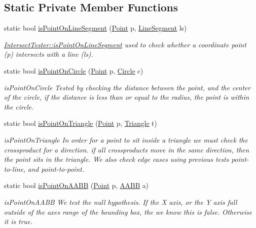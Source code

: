 \subsection*{Static Private Member Functions}
\begin{DoxyCompactItemize}
\item 
static bool \hyperlink{class_intersect_tester_a95ba0d50e91eb8559aa3c6a4dc0d4c0f}{is\+Point\+On\+Line\+Segment} (\hyperlink{class_point}{Point} p, \hyperlink{class_line_segment}{Line\+Segment} ls)
\begin{DoxyCompactList}\small\item\em \hyperlink{class_intersect_tester_a95ba0d50e91eb8559aa3c6a4dc0d4c0f}{Intersect\+Tester\+::is\+Point\+On\+Line\+Segment} used to check whether a coordinate point (p) intersects with a line (ls). \end{DoxyCompactList}\item 
static bool \hyperlink{class_intersect_tester_a1adb6abbf2f6454b48be18cf5eb69333}{is\+Point\+On\+Circle} (\hyperlink{class_point}{Point} p, \hyperlink{class_circle}{Circle} c)
\begin{DoxyCompactList}\small\item\em is\+Point\+On\+Circle Tested by checking the distance between the point, and the center of the circle, if the distance is less than or equal to the radius, the point is within the circle. \end{DoxyCompactList}\item 
static bool \hyperlink{class_intersect_tester_a04fb92f5e4c68c3f3a91321b94c6011f}{is\+Point\+On\+Triangle} (\hyperlink{class_point}{Point} p, \hyperlink{class_triangle}{Triangle} t)
\begin{DoxyCompactList}\small\item\em is\+Point\+On\+Triangle In order for a point to sit inside a triangle we must check the crossproduct for a direction. if all crossproducts move in the same direction, then the point sits in the triangle. We also check edge cases using previous tests point-\/to-\/line, and point-\/to-\/point. \end{DoxyCompactList}\item 
static bool \hyperlink{class_intersect_tester_a7d951e17cc8d244ea34b3e75d53e5bca}{is\+Point\+On\+A\+A\+BB} (\hyperlink{class_point}{Point} p, \hyperlink{class_a_a_b_b}{A\+A\+BB} a)
\begin{DoxyCompactList}\small\item\em is\+Point\+On\+A\+A\+BB We test the null hypothesis. If the X axis, or the Y axis fall outside of the axes range of the bounding box, the we know this is false. Otherwise it is true. \end{DoxyCompactList}\item 

\end{DoxyCompactItemize}
